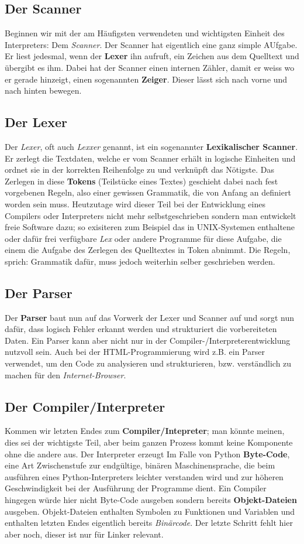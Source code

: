 \documentclass[b5paper,10pt,dvips,fleqn,titlepage,twoside]{book}
\begin{document}
\subsection{Der Scanner}
Beginnen wir mit der am Häufigsten verwendeten und wichtigsten Einheit des Interpreters: Dem \emph{Scanner}.
Der Scanner hat eigentlich eine ganz simple AUfgabe. Er liest jedesmal, wenn der \textbf{Lexer} ihn aufruft, ein Zeichen aus dem Quelltext und übergibt es ihm. Dabei hat der Scanner einen internen Zähler, damit er weiss wo er gerade hinzeigt, einen sogenannten \textbf{Zeiger}. Dieser lässt sich nach vorne und nach hinten bewegen.
\subsection{Der Lexer}
Der \emph{Lexer}, oft auch \emph{Lexxer} genannt, ist ein sogenannter \textbf{Lexikalischer Scanner}. Er zerlegt die Textdaten, welche er vom Scanner erhält in logische Einheiten und ordnet sie in der korrekten Reihenfolge zu und verknüpft das Nötigste.\newline
Das Zerlegen in diese \textbf{Tokens} (Teilstücke eines Textes) geschieht dabei nach fest vorgebenen Regeln, also einer gewissen Grammatik, die von Anfang an definiert worden sein muss. Heutzutage wird dieser Teil bei der Entwicklung eines Compilers oder Interpreters nicht mehr selbstgeschrieben sondern man entwickelt freie Software dazu; so exisiteren zum Beispiel das in UNIX-Systemen enthaltene oder dafür frei verfügbare \emph{Lex} oder andere Programme für diese Aufgabe, die einem die Aufgabe des Zerlegen des Quelltextes in Token abnimmt. Die Regeln, sprich: Grammatik dafür, muss jedoch weiterhin selber geschrieben werden.
\subsection{Der Parser}
Der \textbf{Parser} baut nun auf das Vorwerk der Lexer und Scanner auf und sorgt nun dafür, dass logisch Fehler erkannt werden und strukturiert die vorbereiteten Daten. Ein Parser kann aber nicht nur in der Compiler-/Interpreterentwicklung nutzvoll sein. Auch bei der HTML-Programmierung wird z.B. ein Parser verwendet, um den Code zu analysieren und strukturieren, bzw. verständlich zu machen für den \emph{Internet-Browser}.
\subsection{Der Compiler/Interpreter}
Kommen wir letzten Endes zum \textbf{Compiler/Intepreter}; man könnte meinen, dies sei der wichtigste Teil, aber beim ganzen Prozess kommt keine Komponente ohne die andere aus.\newline
Der Interpreter erzeugt Im Falle von Python \textbf{Byte-Code}, eine Art Zwischenstufe zur endgültige, binären Maschinensprache, die beim ausführen eines Python-Interpreters leichter verstanden wird und zur höheren Geschwindigkeit bei der Ausführung der Programme dient. Ein Compiler hingegen würde hier nicht Byte-Code ausgeben sondern bereits \textbf{Objekt-Dateien} ausgeben. Objekt-Dateien enthalten Symbolen zu Funktionen und Variablen und enthalten letzten Endes eigentlich bereits \emph{Binärcode}. Der letzte Schritt fehlt hier aber noch, dieser ist nur für Linker relevant.
\end{document}
